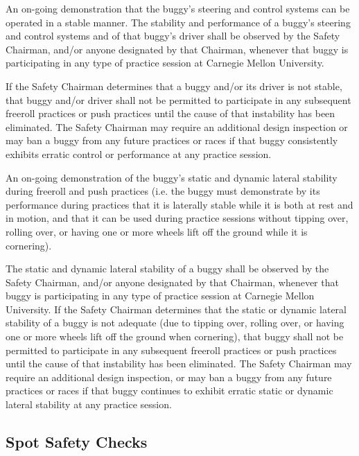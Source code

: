 An on-going demonstration that the buggy's steering and control systems can be operated in a stable manner. The stability and performance of a buggy's steering and control systems and of that buggy's driver shall be observed by the Safety Chairman, and/or anyone designated by that Chairman, whenever that buggy is participating in any type of practice session at Carnegie Mellon University.

If the Safety Chairman determines that a buggy and/or its driver is not stable, that buggy and/or driver shall not be permitted to participate in any subsequent freeroll practices or push practices until the cause of that instability has been eliminated. The Safety Chairman may require an additional design inspection or may ban a buggy from any future practices or races if that buggy consistently exhibits erratic control or performance at any practice session.

An on-going demonstration of the buggy's static and dynamic lateral stability during freeroll and push practices (i.e. the buggy must demonstrate by its performance during practices that it is laterally stable while it is both at rest and in motion, and that it can be used during practice sessions without tipping over, rolling over, or having one or more wheels lift off the ground while it is cornering).

The static and dynamic lateral stability of a buggy shall be observed by the Safety Chairman, and/or anyone designated by that Chairman, whenever that buggy is participating in any type of practice session at Carnegie Mellon University. If the Safety Chairman determines that the static or dynamic lateral stability of a buggy is not adequate (due to tipping over, rolling over, or having one or more wheels lift off the ground when cornering), that buggy shall not be permitted to participate in any subsequent freeroll practices or push practices until the cause of that instability has been eliminated. The Safety Chairman may require an additional design inspection, or may ban a buggy from any future practices or races if that buggy continues to exhibit erratic static or dynamic lateral stability at any practice session.

\subsection{Spot Safety Checks}

